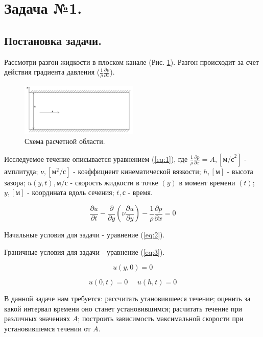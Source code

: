 \section{Задача №1.}
\subsection{Постановка задачи.}
Рассмотри разгон жидкости в плоском канале (Рис. \ref{fig:1}). Разгон происходит за счет действия градиента давления ($\frac{1}{\rho}\frac{\partial{p}}{\partial{x}}$).

\begin{figure}[H]
    \centering
    \includegraphics[width=0.5\textwidth]{images/1.png}
    \caption{Схема расчетной области.}
    \label{fig:1}
\end{figure}

Исследуемое течение описывается уравнением (\ref{eq:1}), где $\frac{1}{\rho}\frac{\partial p}{\partial x}=A, [\text{м/с}^2]$ - амплитуда;
$\nu, [\text{м}^2/\text{с}]$ - коэффициент кинематической вязкости; $h, [\text{м}]$ - высота зазора; $u(y,t), \text{м/с}$ - скорость жидкости в точке $(y)$ в момент времени $(t)$; $y, [\text{м}]$ - координата вдоль сечения; $t, \text{с}$ - время.    

\begin{equation}
    \frac{\partial u}{\partial t}-\frac{\partial}{\partial y} \left( \nu \frac{\partial u}{\partial y} \right)-\frac{1}{\rho}\frac{\partial p}{\partial x} = 0
\label{eq:1}
\end{equation}

Начальные условия для задачи - уравнение (\ref{eq:2}). 

Граничные условия для задачи - уравнение (\ref{eq:3}).

\begin{equation}
    u(y,0) = 0
\label{eq:2}
\end{equation}

\begin{equation}
    u(0,t) = 0 ~~~~~~u(h,t) = 0
\label{eq:3}
\end{equation}

В данной задаче нам требуется: рассчитать утановившееся течение; оценить за какой интервал времени оно станет установившимся;
расчитать течение при различных значениях $A$; построить зависимость максимальной скорости при установившемся течении от $A$.

